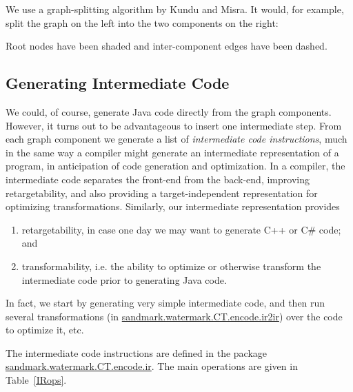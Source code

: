 We use a graph-splitting algorithm by Kundu and Misra. It would,
for example, split the graph on the left into the two components
on the right:
\begin{center}

\end{center}
Root nodes have been shaded and inter-component edges have been dashed.


\subsection{Generating Intermediate Code}
We could, of course, generate Java code directly from the 
graph components. However, it turns out to be advantageous
to insert one intermediate step. From each graph component
we generate a list of {\em intermediate code instructions},
much in the same way a compiler might generate an intermediate
representation of a program, in anticipation of code generation
and optimization. In a compiler, the intermediate code 
separates the front-end from the back-end, improving
retargetability, and also providing a target-independent
representation for optimizing transformations. Similarly,
our intermediate representation provides
\begin{enumerate}
   \item retargetability, in case one day we may want to
         generate C++ or C\# code; and
   \item transformability, i.e. the ability to optimize
         or otherwise transform the intermediate code
         prior to generating Java code.
\end{enumerate}
In fact, we start by generating very simple intermediate
code, and then run several transformations 
(in \url{sandmark.watermark.CT.encode.ir2ir}) over the code to 
optimize it, etc.

The intermediate code instructions are defined in the package
\url{sandmark.watermark.CT.encode.ir}. The main operations are given in
Table~\ref{IRops}.

